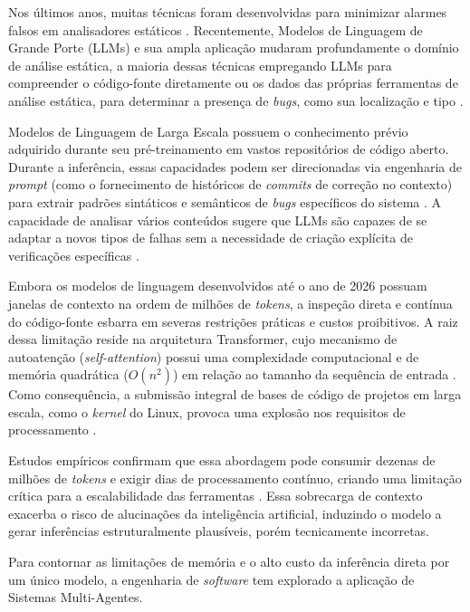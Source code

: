 \documentclass[
    12pt,                %
    openright,           %
    oneside,             %
    a4paper,             %
    english,             %
    brazil               %
]{abntex2}
\begin{document}
\par
Nos últimos anos, muitas técnicas foram desenvolvidas para minimizar alarmes falsos em analisadores estáticos \cite{jiang2025factaligned}.
Recentemente, Modelos de Linguagem de Grande Porte (LLMs) e sua ampla aplicação mudaram profundamente o domínio de análise estática, a maioria dessas técnicas empregando LLMs para compreender o código-fonte diretamente ou os dados das próprias ferramentas de análise estática, para determinar a presença de \textit{bugs}, como sua localização e tipo \cite{hou2025generation}.
\par
Modelos de Linguagem de Larga Escala possuem o conhecimento prévio adquirido durante seu pré-treinamento em vastos repositórios de código aberto. 
Durante a inferência, essas capacidades podem ser direcionadas via engenharia de \textit{prompt} (como o fornecimento de históricos de \textit{commits} de correção no contexto) para extrair padrões sintáticos e semânticos de \textit{bugs} específicos do sistema \cite{tang2021grammar}. 
A capacidade de analisar vários conteúdos sugere que LLMs são capazes de se adaptar a novos tipos de falhas sem a necessidade de criação explícita de verificações específicas \cite{yang2025knighter}.
\par
Embora os modelos de linguagem desenvolvidos até o ano de 2026 possuam janelas de contexto na ordem de milhões de \textit{tokens}, a inspeção direta e contínua do código-fonte esbarra em severas restrições práticas e custos proibitivos.
A raiz dessa limitação reside na arquitetura Transformer, cujo mecanismo de autoatenção (\textit{self-attention}) possui uma complexidade computacional e de memória quadrática ($O(n^2)$) em relação ao tamanho da sequência de entrada \cite{vaswani2017attention}.
Como consequência, a submissão integral de bases de código de projetos em larga escala, como o \textit{kernel} do Linux, provoca uma explosão nos requisitos de processamento \cite{tunstall2022natural}.
\par 
Estudos empíricos confirmam que essa abordagem pode consumir dezenas de milhões de \textit{tokens} e exigir dias de processamento contínuo, criando uma limitação crítica para a escalabilidade das ferramentas \cite{hou2025generation}.
Essa sobrecarga de contexto exacerba o risco de alucinações da inteligência artificial, induzindo o modelo a gerar inferências estruturalmente plausíveis, porém tecnicamente incorretas.
\par
Para contornar as limitações de memória e o alto custo da inferência direta por um único modelo, a engenharia de \textit{software} tem explorado a aplicação de Sistemas Multi-Agentes.
\end{document}
